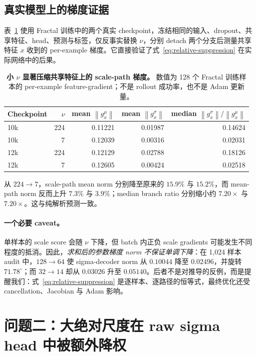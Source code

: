 \documentclass[10pt]{article}
\newcommand{\norm}[1]{\left\lVert#1\right\rVert}
\begin{document}
\subsection{真实模型上的梯度证据}

表~\ref{tab:feature-grads} 使用 Fractal 训练中的两个真实 checkpoint，冻结相同的输入、dropout、共享特征、head、预测与标签，仅反事实替换 $\nu$，分别 detach 两个分支后测量共享特征 $x$ 收到的 per-example 梯度。它直接验证了式~\eqref{eq:relative-suppression} 在实际网络中的后果。

\begin{table}[h]
\centering
\caption{\textbf{小 $\nu$ 显著压缩共享特征上的 scale-path 梯度。} 数值为 128 个 Fractal 训练样本的 per-example feature-gradient；不是 rollout 成功率，也不是 Adam 更新量。}
\label{tab:feature-grads}
\small
\begin{tabular}{@{}lrrrr@{}}
\toprule
Checkpoint & $\nu$ & mean $\norm{g_x^\mu}$ & mean $\norm{g_x^\sigma}$ & median $\norm{g_x^\sigma}/\norm{g_x^\mu}$ \\
\midrule
10k & 224 & 0.11221 & 0.01987 & 0.14624 \\
10k & 7   & 0.12039 & 0.00316 & 0.02031 \\
\addlinespace
12k & 224 & 0.12129 & 0.02788 & 0.18126 \\
12k & 7   & 0.12605 & 0.00424 & 0.02518 \\
\bottomrule
\end{tabular}
\end{table}

从 $224\rightarrow7$，scale-path mean norm 分别降至原来的 $15.9\%$ 与 $15.2\%$，而 mean-path norm 反而上升 $7.3\%$ 与 $3.9\%$；median branch ratio 分别缩小约 $7.20\times$ 与 $7.20\times$。这与纯解析预测一致。

\paragraph{一个必要 caveat。}
单样本的 scale score 会随 $\nu$ 下降，但 batch 内正负 scale gradients 可能发生不同程度的抵消。因此，\emph{求和后的参数梯度 norm 不保证单调下降}：在 1,024 样本 audit 中，$128\rightarrow64$ 使 sigma-decoder norm 从 $0.10044$ 降至 $0.02496$，并旋转 $71.78^\circ$；而 $32\rightarrow14$ 却从 $0.03026$ 升至 $0.05140$。后者不是对推导的反例，而是提醒我们：式~\eqref{eq:relative-suppression} 是逐样本、逐路径的恒等式，最终优化还受 cancellation、Jacobian 与 Adam 影响。

\section{问题二：大绝对尺度在 raw sigma head 中被额外降权}
\end{document}
